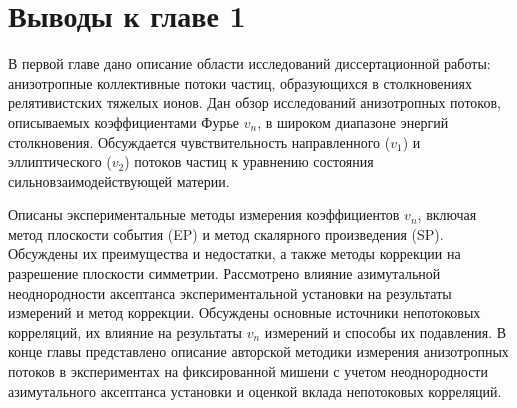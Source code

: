 \section{Выводы к главе 1}

В первой главе дано описание области исследований диссертационной работы: анизотропные коллективные потоки частиц, образующихся в столкновениях релятивистских тяжелых ионов.
Дан обзор исследований анизотропных потоков, описываемых коэффициентами Фурье $v_n$,  в широком диапазоне энергий столкновения.
Обсуждается чувствительность направленного ($v_1$) и эллиптического ($v_2$) потоков частиц к уравнению состояния сильновзаимодействующей материи.

Описаны экспериментальные методы измерения коэффициентов $v_n$, включая метод плоскости события (EP) и метод скалярного произведения (SP). 
Обсуждены их преимущества и недостатки, а также методы коррекции на разрешение плоскости симметрии. 
Рассмотрено влияние азимутальной неоднородности аксептанса экспериментальной установки на результаты измерений и метод коррекции. 
Обсуждены основные  источники непотоковых корреляций, их влияние на результаты $v_n$  измерений и способы их подавления. 
В конце главы представлено описание авторской методики измерения анизотропных потоков в экспериментах на фиксированной мишени с учетом неоднородности азимутального аксептанса установки и оценкой вклада непотоковых корреляций.